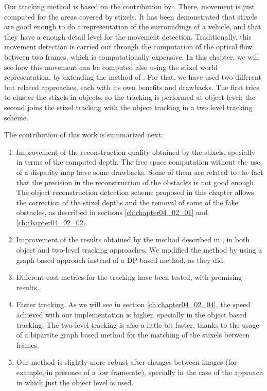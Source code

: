 Our tracking method is based on the contribution by \cite{gunyel2012stixels}. There, movement is just computed for the areas covered by stixels. It has been demonstrated that stixels are good enough to do a representation of the surroundings of a vehicle, and that they have a enough detail level for the movement detection. Traditionally, this movement detection is carried out through the computation of the optical flow between two frames, which is computationally expensive. In this chapter, we will see how this movement can be computed also using the stixel world representation, by extending the method of \cite{gunyel2012stixels}. For that, we have used two different but related approaches, each with its own benefits and drawbacks. The first tries to cluster the stixels in objects, so the tracking is performed at object level; the second joins the stixel tracking with the object tracking in a two level tracking scheme.

The contribution of this work is summarized next:
\begin{enumerate}
 \item Improvement of the reconstruction quality obtained by the stixels, specially in terms of the computed depth. The free space computation without the use of a disparity map have some drawbacks. Some of them are related to the fact that the precision in the reconstruction of the obstacles is not good enough. The object reconstruction detection scheme proposed in this chapter allows the correction of the stixel depths and the removal of some of the fake obstacles, as described in sections \ref{ch:chapter04_02_01} and \ref{ch:chapter04_02_02}.
 \item Improvement of the results obtained by the method described in \cite{gunyel2012stixels}, in both object and two-level tracking approaches. We modified the method by using a graph-based approach instead of a \ac{DP} based method, as they did. 
 \item Different cost metrics for the tracking have been tested, with promising results. 
 \item Faster tracking. As we will see in section \ref{ch:chapter04_02_04}, the speed achieved with our implementation is higher, specially in the object based tracking. The two-level tracking is also a little bit faster, thanks to the usage of a bipartite graph based method for the matching of the stixels between frames. 
 \item Our method is slightly more robust after changes between images (for example, in presence of a low framerate), specially in the case of the approach in which just the object level is used. 
\end{enumerate}

